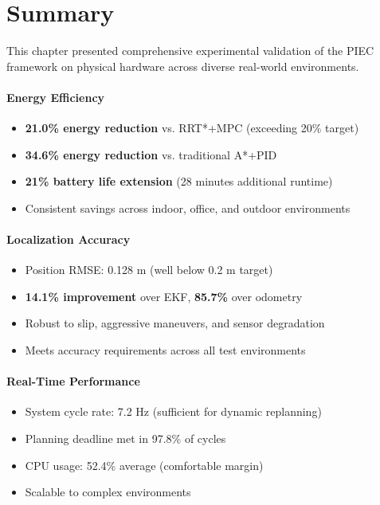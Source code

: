 \section{Summary}

This chapter presented comprehensive experimental validation of the PIEC framework on physical hardware across diverse real-world environments.

\paragraph{Energy Efficiency}
\begin{itemize}
    \item \textbf{21.0\% energy reduction} vs. RRT*+MPC (exceeding 20\% target)
    \item \textbf{34.6\% energy reduction} vs. traditional A*+PID
    \item \textbf{21\% battery life extension} (28 minutes additional runtime)
    \item Consistent savings across indoor, office, and outdoor environments
\end{itemize}

\paragraph{Localization Accuracy}
\begin{itemize}
    \item Position RMSE: 0.128 m (well below 0.2 m target)
    \item \textbf{14.1\% improvement} over EKF, \textbf{85.7\%} over odometry
    \item Robust to slip, aggressive maneuvers, and sensor degradation
    \item Meets accuracy requirements across all test environments
\end{itemize}

\paragraph{Real-Time Performance}
\begin{itemize}
    \item System cycle rate: 7.2 Hz (sufficient for dynamic replanning)
    \item Planning deadline met in 97.8\% of cycles
    \item CPU usage: 52.4\% average (comfortable margin)
    \item Scalable to complex environments
\end{itemize}

